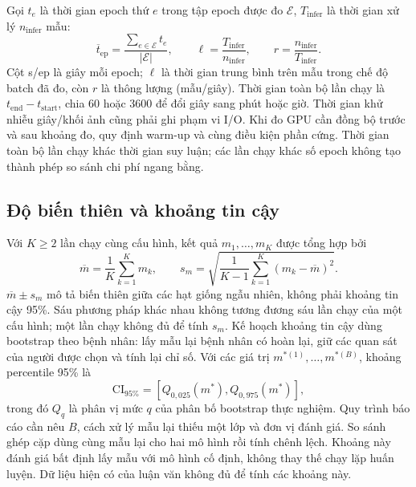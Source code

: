 Gọi $t_e$ là thời gian epoch thứ $e$ trong tập epoch được đo
$\mathcal E$, $T_{\mathrm{infer}}$ là thời gian xử lý $n_{\mathrm{infer}}$ mẫu:
\begin{equation}
 \overline t_{\mathrm{ep}}=\frac{\sum_{e\in\mathcal E}t_e}{|\mathcal E|},\qquad
 \ell=\frac{T_{\mathrm{infer}}}{n_{\mathrm{infer}}},\qquad
 r=\frac{n_{\mathrm{infer}}}{T_{\mathrm{infer}}}.
 \label{eq:metric-timing}
\end{equation}
Cột s/ep là giây mỗi epoch; $\ell$ là thời gian trung bình trên mẫu
trong chế độ batch đã đo, còn $r$ là thông lượng (mẫu/giây).
Thời gian toàn bộ lần chạy là $t_{\mathrm{end}}-t_{\mathrm{start}}$, chia 60 hoặc
3600 để đổi giây sang phút hoặc giờ. Thời gian khử nhiễu giây/khối ảnh
cũng phải ghi phạm vi I/O. Khi đo GPU cần đồng bộ trước và sau khoảng
đo, quy định warm-up và cùng điều kiện phần cứng. Thời gian toàn bộ lần chạy
khác thời gian suy luận; các lần chạy khác số epoch không tạo thành phép so sánh chi phí ngang bằng.

\subsection{Độ biến thiên và khoảng tin cậy}
Với $K\geq2$ lần chạy cùng cấu hình, kết quả $m_1,\ldots,m_K$ được tổng hợp bởi
\begin{equation}
 \overline m=\frac1K\sum_{k=1}^{K}m_k,\qquad
 s_m=\sqrt{\frac{1}{K-1}\sum_{k=1}^{K}(m_k-\overline m)^2}.
 \label{eq:metric-seed-statistics}
\end{equation}
$\overline m\pm s_m$ mô tả biến thiên giữa các hạt giống ngẫu nhiên, không phải khoảng tin cậy
95\%. Sáu phương pháp khác nhau không tương đương sáu lần chạy của một cấu
hình; một lần chạy không đủ để tính $s_m$.
Kế hoạch khoảng tin cậy dùng bootstrap theo bệnh nhân: lấy mẫu lại bệnh
nhân có hoàn lại, giữ các quan sát của người được chọn và tính lại chỉ số.
Với các giá trị $m^{*(1)},\ldots,m^{*(B)}$, khoảng percentile 95\% là \cite{efron1986bootstrap}
\begin{equation}
 \mathrm{CI}_{95\%}=\left[Q_{0{,}025}(m^*),Q_{0{,}975}(m^*)\right],
 \label{eq:metric-bootstrap}
\end{equation}
trong đó $Q_q$ là phân vị mức $q$ của phân bố bootstrap thực nghiệm.
Quy trình báo cáo cần nêu $B$, cách xử lý mẫu lại thiếu một lớp và đơn vị đánh giá.
So sánh ghép cặp dùng cùng mẫu lại cho hai mô hình rồi tính chênh lệch.
Khoảng này đánh giá bất định lấy mẫu với mô hình cố định, không thay thế
chạy lặp huấn luyện. Dữ liệu hiện có của luận văn không đủ để tính các khoảng này.

